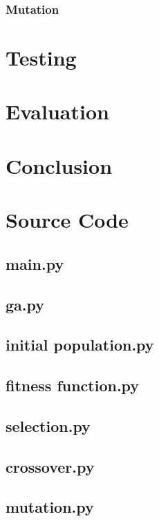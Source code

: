 \documentclass[a4paper, 12pt]{report}
\begin{document}
\subsection{Mutation}  %

\chapter{Testing}  %

\chapter{Evaluation}  %

\chapter{Conclusion}  %

\renewcommand\bibname{References}  %


\appendix  %

\chapter{Source Code}

\lstset{basicstyle=\ttfamily, breaklines=true}

\section{main.py}


\section{ga.py}


\section{initial population.py}


\section{fitness function.py}


\section{selection.py}


\section{crossover.py}


\section{mutation.py}

\end{document}
